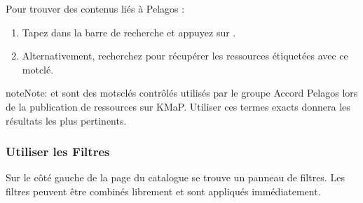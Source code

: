 \documentclass[letterpaper,10pt,english]{sphinxmanual}
\begin{document}
\sphinxAtStartPar
Pour trouver des contenus liés à Pelagos :
\begin{enumerate}
%
\item {} 
\sphinxAtStartPar
Tapez  dans la barre de recherche et appuyez sur .

\item {} 
\sphinxAtStartPar
Alternativement, recherchez  pour récupérer les ressources
étiquetées avec ce mot\sphinxhyphen{}clé.

\end{enumerate}

\begin{sphinxadmonition}{note}{Note:}
\sphinxAtStartPar
{} et  sont des mots\sphinxhyphen{}clés contrôlés utilisés
par le groupe Accord Pelagos lors de la publication de ressources sur KMaP. Utiliser
ces termes exacts donnera les résultats les plus pertinents.
\end{sphinxadmonition}


\subsubsection{Utiliser les Filtres}
\label{\detokenize{fr/02_trouver_visualiser:utiliser-les-filtres}}
\sphinxAtStartPar
Sur le côté gauche de la page du catalogue se trouve un panneau de filtres. Les filtres
peuvent être combinés librement et sont appliqués immédiatement.
\end{document}

